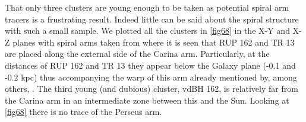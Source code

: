 \documentclass[draft]{aa}
\begin{document}
That only three clusters are young enough to be taken as potential spiral arm
tracers is a frustrating result. Indeed little can be said about the spiral
structure with such a small sample. We plotted all the clusters in 
\ref{fig68} in the X-Y and X-Z planes with spiral arms taken from 
\cite{valle_2005} where it is seen that RUP 162 and TR 13  are placed along
the external side of the Carina arm. Particularly, at the distances of RUP 162
and TR 13 they appear below the Galaxy plane (-0.1 and -0.2 kpc) thus
accompanying the warp of this arm already mentioned by, among others, 
\cite{Cersosimo_2009}. The third young (and dubious) cluster, vdBH 162, is
relatively far from the Carina arm in an intermediate zone between this and the
Sun. Looking at \ref{fig68} there is no trace of the Perseus arm. 
\end{document}
